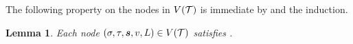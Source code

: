 \documentclass[11pt]{article}
\newtheorem{lemma}[theorem]{Lemma}
\newtheorem{corollary}[theorem]{Corollary}
\newcommand{\seqS}{\boldsymbol{s}}
\newcommand{\qgl}[1]{{\color{purple}{#1}}}
\begin{document}
The following property on the nodes in $V(\mathcal{T})$ is immediate by  and the induction.
\begin{lemma}\label{lemma-property-tct-vl}
Each node $(\sigma, \tau, \seqS, v, L)\in V(\+T)$ satisfies .
\end{lemma}





\end{document}
